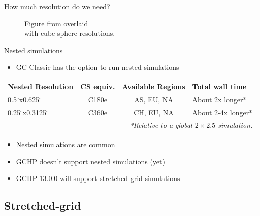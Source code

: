 \documentclass[10pt]{beamer}
\begin{document}
\begin{frame}[fragile]{How much resolution do we need?}
\begin{minipage}[c]{0.49\textwidth}
\begin{figure}
            \captionsetup{labelformat=empty}
            \caption{Figure from \cite{wallace_atmospheric_2006} overlaid \\ with cube-sphere resolutions.}
        \end{figure}
    \end{minipage}
\end{frame}

\begin{frame}[fragile]{Nested simulations}
    \begin{itemize}
        \item GC Classic has the option to run nested simulations
    \end{itemize}
    
    \footnotesize
    \begin{table}[]
    \begin{tabular}{lccl}
        \hline
        \textbf{Nested Resolution} & \textbf{CS equiv.} &  \textbf{Available Regions} & \textbf{Total wall time} \\ 
        \hline
        0.5$^{\circ}$x0.625$^{\circ}$ & C180e & AS, EU, NA & About 2x longer* \\ 
        0.25$^{\circ}$x0.3125$^{\circ}$ & C360e & CH, EU, NA & About 2-4x longer* \\ 
        \hline
        \multicolumn{4}{r}{\tiny\textit{*Relative to a global $2 \times 2.5$ simulation.}} \\ 
    \end{tabular}
    \end{table}
    \normalsize
    \begin{itemize}
        \item Nested simulations are common
    \end{itemize}
    \vfill
    \begin{itemize}
        \item GCHP doesn't support nested simulations (yet)
        \vspace{0.3cm}
        \item GCHP 13.0.0 will support stretched-grid simulations
    \end{itemize}
\end{frame}

\subsection{Stretched-grid}
\frame{\sectionpage}
\end{document}
